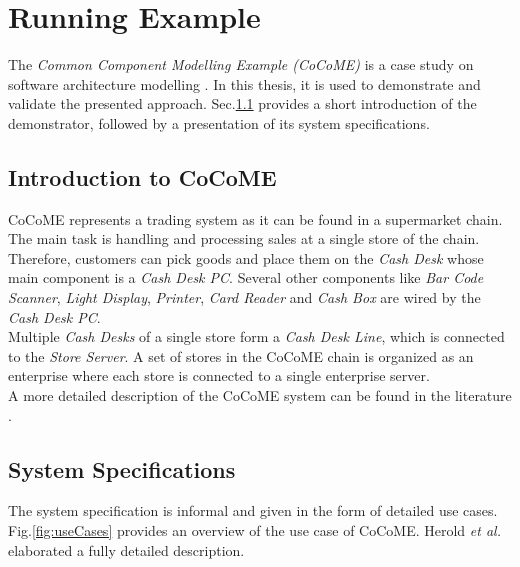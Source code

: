 \chapter{Running Example}
\label{ch:CoCoME}
The \textit{Common Component Modelling Example (CoCoME)} is a case study on software architecture modelling \cite{CoCoMETechnical}\cite{CoCoMEOld}. In this thesis, it is used to demonstrate and validate the presented approach. Sec.\ref{sec:CoCoME:Introduction} provides a short introduction of the demonstrator, followed by a presentation of its system specifications.


\section{Introduction to CoCoME}
\label{sec:CoCoME:Introduction}
CoCoME represents a trading system as it can be found in a supermarket chain. The main task is handling and processing sales at a single store of the chain. Therefore, customers can pick goods and place them on the \textit{Cash Desk} whose main component is a \textit{Cash Desk PC}. Several other components like \textit{Bar Code Scanner}, \textit{Light Display}, \textit{Printer}, \textit{Card Reader} and \textit{Cash Box} are wired by the  \textit{Cash Desk PC}. \\
Multiple  \textit{Cash Desks} of a single store form a  \textit{Cash Desk Line}, which is connected to the  \textit{Store Server}. A set of stores in the CoCoME chain is organized as an enterprise where each store is connected to a single enterprise server. \\
A more detailed description of the CoCoME system can be found in the literature \cite{CoCoMEOld}\cite{CoCoMETechnical}. 
 


\section{System Specifications}
\label{sec:CoCoME:systemSpecifications}
The system specification is informal and given in the form of detailed use cases. Fig.\ref{fig:useCases} provides an overview of the use case of CoCoME. Herold \textit{et al.} elaborated a fully detailed description\cite{CoCoMEOld}.






